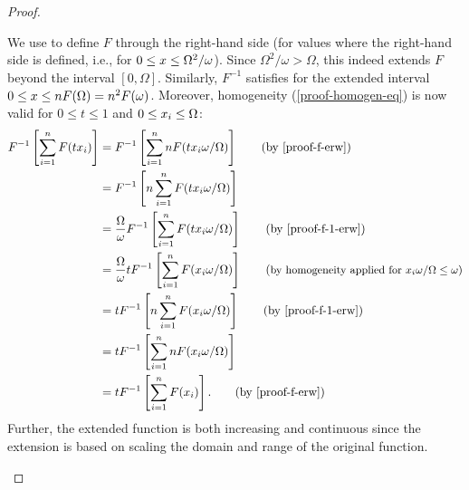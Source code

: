 \begin{proof}
\begin{proofpart}
		We use  to define $F$ through the right-hand side (for values where the right-hand side is defined, i.e., for $0 \leq x \leq \Omega^2/\omega$). Since $\Omega^2/\omega > \Omega$, this indeed extends $F$ beyond the interval $[0, \Omega]$.
		Similarly, $F^{-1}$ satisfies  for the extended interval $0 \leq x \leq nF(\Omega) = n^2 F(\omega)$.
		Moreover, homogeneity (\cref{proof-homogen-eq}) is now valid for $0 \leq t \leq 1$ and $0 \leq x_i \leq \Omega$:
		{\allowdisplaybreaks[1]
      \begin{align*}
			F^{-1} \left[ \sum_{i=1}^{n} F(t \ta_i) \right] & = F^{-1} \left[ \sum_{i=1}^{n} nF(t \ta_i \omega / \Omega) \right] \tag{by \cref{proof-f-erw}}                                                               \\
			                                                & = F^{-1} \left[ n \sum_{i=1}^{n} F(t \ta_i \omega / \Omega) \right]                                                                                          \\
			                                                & = \frac{\Omega}{\omega} F^{-1} \left[ \sum_{i=1}^{n} F(t \ta_i \omega / \Omega) \right] \tag{by \cref{proof-f-1-erw}}                                        \\
			                                                & = \frac{\Omega}{\omega} t F^{-1} \left[ \sum_{i=1}^{n} F(\ta_i \omega / \Omega) \right] \tag{\small by homogeneity applied for $\ta_i \omega / \Omega \leq \omega$} \\
			                                                & = t F^{-1} \left[ n \sum_{i=1}^{n} F(\ta_i \omega / \Omega) \right] \tag{by \cref{proof-f-1-erw}}                                                            \\
			                                                & = t F^{-1} \left[ \sum_{i=1}^{n} n F(\ta_i \omega / \Omega) \right]                                                                                          \\
			                                                & = t F^{-1} \left[ \sum_{i=1}^{n} F(\ta_i) \right]. \tag{by \cref{proof-f-erw}}
		\end{align*}}
		Further, the extended function is both increasing and continuous since the extension is based on scaling the domain and range of the original function.


\end{proofpart}
\end{proof}
